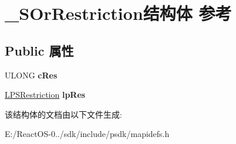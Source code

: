 \hypertarget{struct___s_or_restriction}{}\section{\+\_\+\+S\+Or\+Restriction结构体 参考}
\label{struct___s_or_restriction}
\subsection*{Public 属性}
\begin{DoxyCompactItemize}
\item 
\mbox{\label{struct___s_or_restriction_af0554703499fff0842bf0ca7a0bf2d1e}} 
U\+L\+O\+NG {\bfseries c\+Res}
\item 
\mbox{\label{struct___s_or_restriction_a825b6e2d176ce6e4b7e4d23a5969a99f}} 
\hyperlink{struct___s_restriction}{L\+P\+S\+Restriction} {\bfseries lp\+Res}
\end{DoxyCompactItemize}


该结构体的文档由以下文件生成\+:\begin{DoxyCompactItemize}
\item 
E\+:/\+React\+O\+S-\/0../sdk/include/psdk/mapidefs.\+h\end{DoxyCompactItemize}
